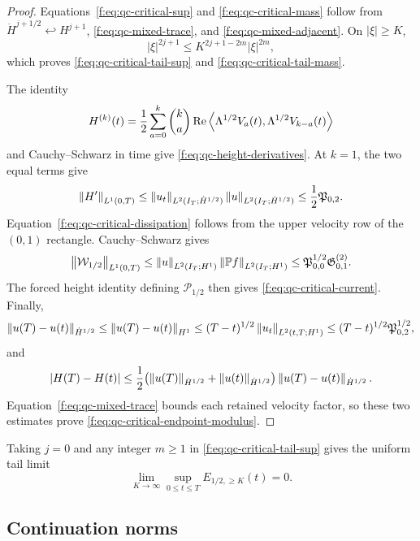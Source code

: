 \begin{proof}
Equations~\eqref{f:eq:qc-critical-sup} and
\eqref{f:eq:qc-critical-mass} follow from
\(\dot H^{j+1/2}\hookleftarrow H^{j+1}\),
\eqref{f:eq:qc-mixed-trace}, and \eqref{f:eq:qc-mixed-adjacent}.
On \(|\xi|\ge K\),
\[
 |\xi|^{2j+1}\le K^{2j+1-2m}|\xi|^{2m},
\]
which proves \eqref{f:eq:qc-critical-tail-sup} and
\eqref{f:eq:qc-critical-tail-mass}.

The identity
\[
 H^{(k)}(t)
 =\frac12\sum_{a=0}^{k}\binom ka
 \operatorname{Re}\left\langle \Lambda^{1/2}V_a(t),\Lambda^{1/2}V_{k-a}(t)\right\rangle
\]
and Cauchy--Schwarz in time give
\eqref{f:eq:qc-height-derivatives}.  At \(k=1\), the two equal terms give
\[
 \left\lVert H'\right\rVert_{L^1(0,T)}
 \le\left\lVert u_t\right\rVert_{L^2(I_T;\dot H^{1/2})}
     \left\lVert u\right\rVert_{L^2(I_T;\dot H^{1/2})}
 \le\frac12\mathfrak P_{0,2}.
\]
Equation~\eqref{f:eq:qc-critical-dissipation} follows from the upper velocity
row of the \((0,1)\) rectangle.  Cauchy--Schwarz gives
\[
 \left\lVert \mathcal W_{1/2}\right\rVert_{L^1(0,T)}
 \le\left\lVert u\right\rVert_{L^2(I_T;H^1)}
     \left\lVert \mathbb P f\right\rVert_{L^2(I_T;H^1)}
 \le\mathfrak P_{0,0}^{1/2}\mathfrak G^{(2)}_{0,1}.
\]
The forced height identity defining \(\mathcal P_{1/2}\) then gives
\eqref{f:eq:qc-critical-current}.  Finally,
\[
 \left\lVert u(T)-u(t)\right\rVert_{\dot H^{1/2}}
 \le\left\lVert u(T)-u(t)\right\rVert_{H^1}
 \le(T-t)^{1/2}\left\lVert u_t\right\rVert_{L^2(t,T;H^1)}
 \le(T-t)^{1/2}\mathfrak P_{0,2}^{1/2},
\]
and
\[
 |H(T)-H(t)|
 \le\frac12\bigl(
 \left\lVert u(T)\right\rVert_{\dot H^{1/2}}+\left\lVert u(t)\right\rVert_{\dot H^{1/2}}
 \bigr)\left\lVert u(T)-u(t)\right\rVert_{\dot H^{1/2}}.
\]
Equation~\eqref{f:eq:qc-mixed-trace} bounds each retained velocity factor, so
these two estimates prove \eqref{f:eq:qc-critical-endpoint-modulus}.
\end{proof}

Taking \(j=0\) and any integer \(m\ge1\) in
\eqref{f:eq:qc-critical-tail-sup} gives the uniform tail limit
\begin{equation}
 \lim_{K\to\infty}\sup_{0\le t\le T}
 E_{1/2,\ge K}(t)=0.
 \label{f:eq:qc-critical-tail-extinction}
\end{equation}

\subsection{Continuation norms}

